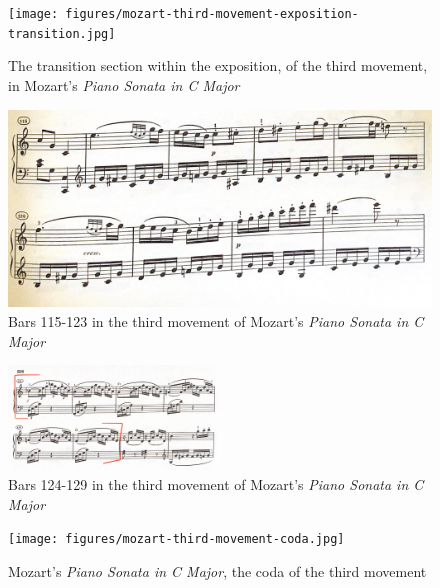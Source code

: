 \begin{figure}
  	\centering
  	\texttt{[image: figures/mozart-third-movement-exposition-transition.jpg]}
  	\caption{The transition section within the exposition, of the third movement, in Mozart's \textit{Piano Sonata in C Major}}
  	\label{fig:mozart-third-movement-exposition-transition}
\end{figure}

\begin{figure}
	\centering
	\includegraphics[width=\textwidth]{figures/mozart-third-movement-bars-116-123.jpg}
	\caption{Bars 115-123 in the third movement of Mozart's \textit{Piano Sonata in C Major}}
	\label{fig:mozart-third-movement-bars-116-123}
\end{figure}

\begin{figure}
	\centering
	\includegraphics[width=0.5\textwidth]{figures/mozart-third-movement-bars-124-129.jpg}
	\caption{Bars 124-129 in the third movement of Mozart's \textit{Piano Sonata in C Major}}
	\label{fig:mozart-third-movement-bars-124-129}
\end{figure}

\begin{figure}
    \centering
    \texttt{[image: figures/mozart-third-movement-coda.jpg]}
    \caption{Mozart's \textit{Piano Sonata in C Major}, the coda of the third movement}
    \label{fig:mozart-third-movement-coda}
\end{figure}
